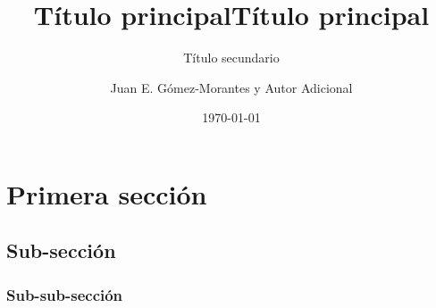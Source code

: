 \documentclass[hidelinks]{article}
\title{Título principal}
\subtitle{Título secundario}
\author{Juan E. Gómez-Morantes y Autor Adicional}
\date{\today}
\title{Título principal}
\begin{document}
\maketitle

\section{Primera sección}
\lipsum[1-3]
\subsection{Sub-sección}
\lipsum[4-5]
\subsubsection{Sub-sub-sección}
\lipsum[6-8]
\end{document}
